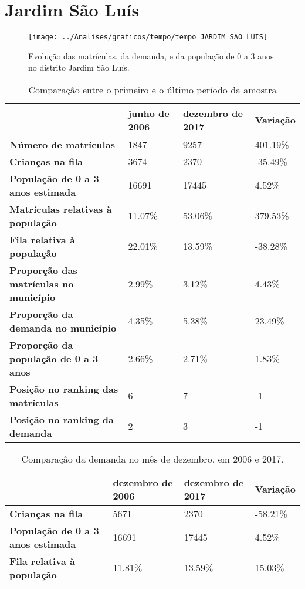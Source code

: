 \section{Jardim São Luís}
\begin{figure}[H]
\centering
\texttt{[image: ../Analises/graficos/tempo/tempo\_JARDIM\_SAO\_LUIS]}
\caption{Evolução das matrículas, da demanda, e da população de 0 a 3 anos no distrito Jardim São Luís.}
\end{figure}
\begin{table}[H]
\begin{tabular}{|l|l|l|l|}
\hline
\textbf{}                                      & \textbf{junho de 2006}       & \textbf{dezembro de 2017}    & \textbf{Variação} \\ \hline
\textbf{Número de matrículas}                  & 1847 & 9257 & 401.19\% \\ \hline
\textbf{Crianças na fila}                      & 3674 & 2370 & -35.49\% \\ \hline
\textbf{População de 0 a 3 anos estimada}      & 16691 & 17445 & 4.52\% \\ \hline
\textbf{Matrículas relativas à população}      & 11.07\% & 53.06\% & 379.53\% \\ \hline
\textbf{Fila relativa à população}             & 22.01\% & 13.59\% & -38.28\% \\ \hline
\textbf{Proporção das matrículas no município} & 2.99\% & 3.12\% & 4.43\% \\ \hline
\textbf{Proporção da demanda no município}     & 4.35\% & 5.38\% & 23.49\% \\ \hline
\textbf{Proporção da população de 0 a 3 anos}  & 2.66\% & 2.71\% & 1.83\% \\ \hline
\textbf{Posição no ranking das matrículas}     & 6 & 7 & -1 \\ \hline
\textbf{Posição no ranking da demanda}         & 2 & 3 & -1 \\ \hline
\end{tabular}
\caption{Comparação entre o primeiro e o último período da amostra}
\end{table}
\begin{table}[H]
\begin{tabular}{|l|l|l|l|}
\hline
\textbf{}                                 & \textbf{dezembro de 2006} & \textbf{dezembro de 2017} & \textbf{Variação} \\ \hline
\textbf{Crianças na fila}                      & 5671 & 2370 & -58.21\% \\ \hline
\textbf{População de 0 a 3 anos estimada}      & 16691 & 17445 & 4.52\% \\ \hline
\textbf{Fila relativa à população}             & 11.81\% & 13.59\% & 15.03\% \\ \hline
\end{tabular}
\caption{Comparação da demanda no mês de dezembro, em 2006 e 2017.}
\end{table}
